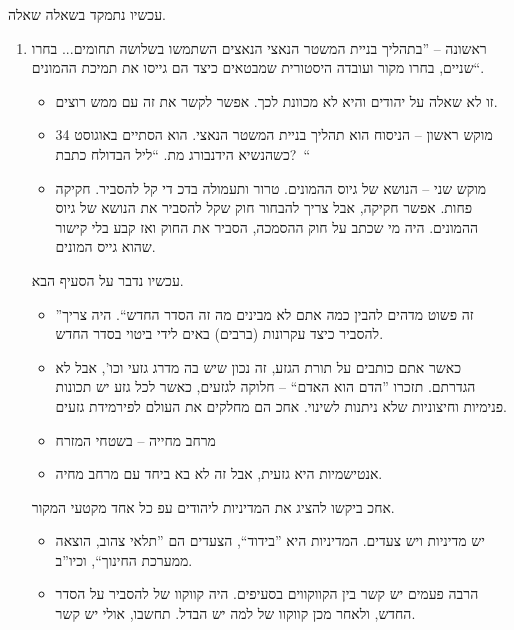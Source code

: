\documentclass[]{../../../../tex/classes/styledArticle}
\begin{document}
	עכשיו נתמקד בשאלה שאלה. 
	\begin{enumerate}
		\item ראשונה – ''בתהליך בניית המשטר הנאצי הנאצים השתמשו בשלושה תחומים... בחרו שניים, בחרו מקור ועובדה היסטורית שמבטאים כיצד הם גייסו את תמיכת ההמונים``. 
		\begin{itemize}
			\item זו לא שאלה על יהודים והיא לא מכוונת לכך. אפשר לקשר את זה עם ממש רוצים. 
			\item מוקש ראשון – הניסוח הוא תהליך בניית המשטר הנאצי. הוא הסתיים באוגוסט 34 כשהנשיא הידנבורג מת. ``ליל הבדולח כתבת?\ \!``
			\item מוקש שני – הנושא של גיוס ההמונים. טרור ותעמולה בדכ די קל להסביר. חקיקה פחות. אפשר חקיקה, אבל צריך להבחור חוק שקל להסביר את הנושא של גיוס ההמונים. היה מי שכתב על חוק ההסמכה, הסביר את החוק ואז קבע בלי קישור שהוא גייס המונים. 
		\end{itemize}
		
		עכשיו נדבר על הסעיף הבא. 
		\begin{itemize}
			\item ''זה פשוט מדהים להבין כמה אתם לא מבינים מה זה הסדר החדש``. היה צריך להסביר כיצד עקרונות (ברבים) באים לידי ביטוי בסדר החדש. 
			\item כאשר אתם כותבים על תורת הגזע, זה נכון שיש בה מדרג גזעי וכו', אבל לא הגדרתם. תזכרו ''הדם הוא האדם`` – חלוקה לגזעים, כאשר לכל גזע יש תכונות פנימיות וחיצוניות שלא ניתנות לשינוי. אחכ הם מחלקים את העולם לפירמידת גזעים. 
			\item מרחב מחייה – בשטחי המזרח
			\item אנטישמיות היא גזעית, אבל זה לא בא ביחד עם מרחב מחיה. 
		\end{itemize}
		אחכ ביקשו להציג את המדיניות ליהודים עפ כל אחד מקטעי המקור. 
		\begin{itemize}
			\item יש מדיניות ויש צעדים. המדיניות היא ''בידוד``, הצעדים הם ''תלאי צהוב, הוצאה ממערכת החינוך``, וכיו''ב. 
			\item הרבה פעמים יש קשר בין הקווקווים בסעיפים. היה קווקוו של להסביר על הסדר החדש, ולאחר מכן קווקוו של למה יש הבדל. תחשבו, אולי יש קשר. 
			

\end{itemize}
\end{enumerate}
\end{document}
